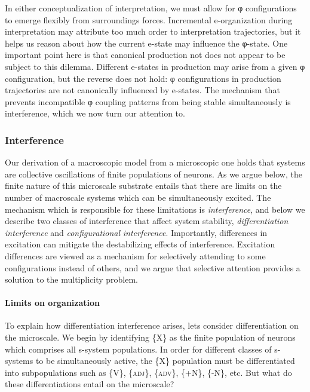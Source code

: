   In either conceptualization of interpretation, we must allow for φ configurations to emerge flexibly from surroundings forces. Incremental e-organization during interpretation may attribute too much order to interpretation trajectories, but it helps us reason about how the current e-state may influence the φ-state. One important point here is that canonical production not does not appear to be subject to this dilemma. Different e-states in production may arise from a given φ configuration, but the reverse does not hold: φ configurations in production trajectories are not canonically influenced by e-states. The mechanism that prevents incompatible φ coupling patterns from being stable simultaneously is interference, which we now turn our attention to.

\subsubsection{Interference}

Our derivation of a macroscopic model from a microscopic one holds that systems are collective oscillations of finite populations of neurons. As we argue below, the finite nature of this microscale substrate entails that there are limits on the number of macroscale systems which can be simultaneously excited. The mechanism which is responsible for these limitations is \textit{interference}, and below we describe two classes of interference that affect system stability, \textit{differentiation} \textit{interference} and \textit{configurational} \textit{interference}. Importantly, differences in excitation can mitigate the destabilizing effects of interference. Excitation differences are viewed as a mechanism for selectively attending to some configurations instead of others, and we argue that selective attention provides a solution to the multiplicity problem.

\paragraph{Limits on organization}

To explain how differentiation interference arises, lets consider differentiation on the microscale. We begin by identifying \{X\} as the finite population of neurons which comprises all s-system populations. In order for different classes of s-systems to be simultaneously active, the \{X\} population must be differentiated into subpopulations such as \{V\}, \{\textsc{adj}\}, \{\textsc{adv}\}, \{+N\}, \{-N\}, etc. But what do these differentiations entail on the microscale?

